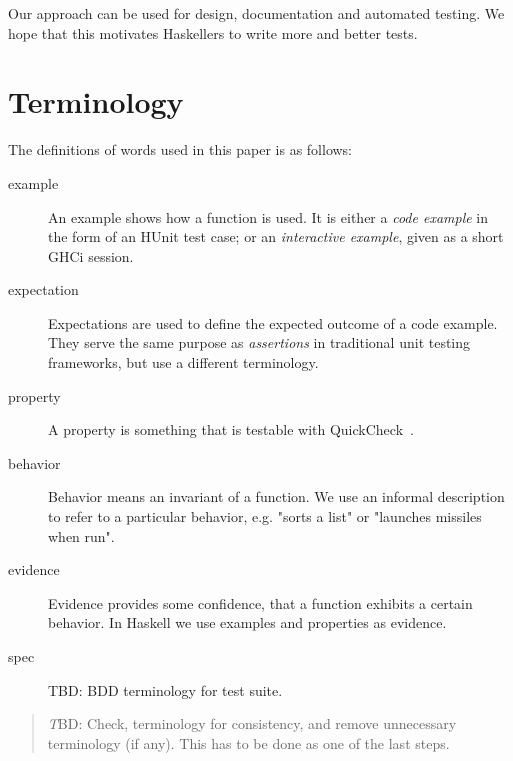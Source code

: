 \documentclass[preprint]{sigplanconf}
\begin{document}
\noindent Our approach can be used for design, documentation and
automated testing.  We hope that this motivates Haskellers to write
more and better tests.

\section{Terminology}

The definitions of words used in this paper is as follows:

\begin{description}

\item[example]
    An example shows how a function is used.  It is either a \emph{code
    example} in the form of an HUnit test case; or an \emph{interactive
    example}, given as a short GHCi session.

\item[expectation]
    Expectations are used to define the expected outcome of a code
    example.  They serve the same purpose as \emph{assertions} in
    traditional unit testing frameworks, but use a different
    terminology.

\item[property]
    A property is something that is testable with
    QuickCheck~\cite{quickcheck}.

\item[behavior]
    Behavior means an invariant of a function.  We use an informal description
    to refer to a particular behavior, e.g.  "sorts a list" or "launches
    missiles when run".

\item[evidence]
    Evidence provides some confidence, that a function exhibits a
    certain behavior.  In Haskell we use examples and properties as
    evidence.

\item[spec]
    TBD: BDD terminology for test suite.
\end{description}


\begin{quote}
    \emph TBD: Check, terminology for consistency, and remove
    unnecessary terminology (if any).  This has to be done as one of
    the last steps.
\end{quote}
\end{document}
